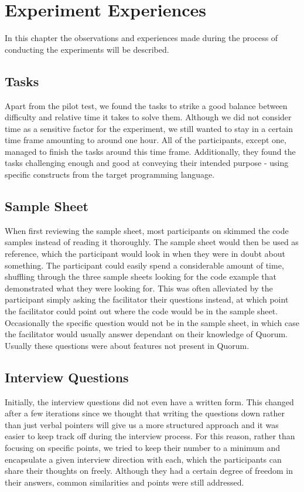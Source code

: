 \chapter{Experiment Experiences}
In this chapter the observations and experiences made during the process of conducting the experiments will be described.

\section{Tasks}
Apart from the pilot test, we found the tasks to strike a good balance between difficulty and relative time it takes to solve them. Although we did not consider time as a sensitive factor for the experiment, we still wanted to stay in a certain time frame amounting to around one hour. All of the participants, except one, managed to finish the tasks around this time frame. Additionally, they found the tasks challenging enough and good at conveying their intended purpose - using specific constructs from the target programming language. 

\section{Sample Sheet}
When first reviewing the sample sheet, most participants on skimmed the code samples instead of reading it thoroughly. The sample sheet would then be used as reference, which the participant would look in when they were in doubt about something. The participant could easily spend a considerable amount of time, shuffling through the three sample sheets looking for the code example that demonstrated what they were looking for. This was often alleviated by the participant simply asking the facilitator their questions instead, at which point the facilitator could point out where the code would be in the sample sheet. Occasionally the specific question would not be in the sample sheet, in which case the facilitator would usually answer dependant on their knowledge of Quorum. Usually these questions were about features not present in Quorum.

\section{Interview Questions}
Initially, the interview questions did not even have a written form. This changed after a few iterations since we thought that writing the questions down rather than just verbal pointers will give us a more structured approach and it was easier to keep track off during the interview process. For this reason, rather than focusing on specific points, we tried to keep their number to a minimum and encapsulate a given interview direction with each, which the participants can share their thoughts on freely. Although they had a certain degree of freedom in their answers, common similarities and points were still addressed. 